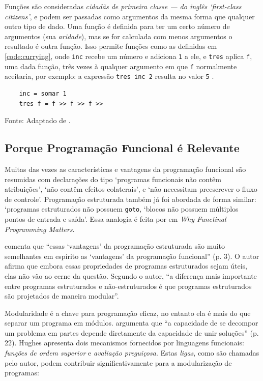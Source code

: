 Funções são consideradas \emph{cidadãs de primeira classe — do inglês ‘first-class
citizens’}, e podem ser passadas como argumentos da mesma forma que qualquer
outro tipo de dado.
Uma função é definida para ter um certo número de argumentos (sua \emph{aridade}),
mas se for calculada com menos argumentos o resultado é outra função.
Isso permite funções como as definidas em \ref{code:currying}, onde \texttt{inc} recebe
um número e adiciona \texttt{1} a ele, e \texttt{tres} aplica \texttt{f}, uma dada função, três
vezes à qualquer argumento em que \texttt{f} normalmente aceitaria, por exemplo: a
expressão \texttt{tres inc 2} resulta no valor \texttt{5} \cite{noble1994}.

\begin{listing}[H]
  \centering \caption{\emph{Currying}.}
  \begin{verbatim}
    inc = somar 1
    tres f = f >> f >> f >>
  \end{verbatim}
  \small Fonte: Adaptado de \textcite{noble1994}.
  \label{code:currying}
\end{listing}
\subsection{Porque Programação Funcional é Relevante}
\label{sec:org777b953}
Muitas das vezes as características e vantagens da programação funcional são
resumidas com declarações do tipo ‘programas funcionais não contêm
atribuições’, ‘não contêm efeitos colaterais’, e ‘não necessitam preescrever
o fluxo de controle’. Programação estruturada também já foi abordada de forma
similar: ‘programas estruturados não possuem \texttt{goto}, ‘blocos não
possuem múltiplos pontos de entrada e saída’. Essa analogia é feita por
\textcite{hughes1990} em \emph{Why Functinal Programming Matters}.

\textcite{hughes1990} comenta que “essas ‘vantagens’ da programação estruturada
são muito semelhantes em espírito as ‘vantagens’ da programação funcional”
(p. 3). O autor afirma que embora essas propriedades de programas
estruturados sejam úteis, elas não vão ao cerne da questão. Segundo o autor,
“a diferença mais importante entre programas estruturados e não-estruturados
é que programas estruturados são projetados de maneira modular”.

Modularidade é a chave para programação eficaz, no entanto ela é mais do que
separar um programa em módulos. \textcite{hughes1990} argumenta que “a
capacidade de se decompor um problema em partes depende diretamente da
capacidade de unir soluções” (p. 22). Hughes apresenta dois mecanismos
fornecidos por linguagens funcionais: \emph{funções de ordem superior} e
\emph{avaliação preguiçosa}. Estas \emph{ligas}, como são chamadas pelo autor, podem
contribuir significativamente para a modularização de programas:

